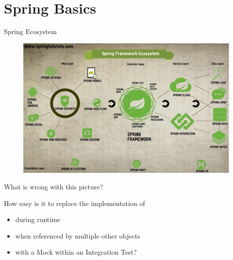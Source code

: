 \part{Spring Basics}


\begin{frame}{Spring Ecosystem}
	\begin{figure}
  	\includegraphics[height=0.7\textheight]{../SpringBasics/images/spring-ecosystem}
	\end{figure}
\end{frame}

\begin{frame}[fragile]{What is wrong with this picture?}
\begin{figure}
\end{figure}
How easy is it to replace the implementation of  \textit{}
\begin{itemize}
	\item during runtime
	\item when referenced by multiple other objects
	\item with a Mock within an Integration Test?
\end{itemize}
\end{frame}

